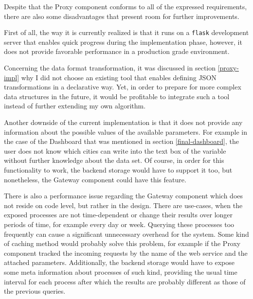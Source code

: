 

Despite that the Proxy component conforms to all of the expressed requirements, there are also some disadvantages that present room for further improvements.

First of all, the way it is currently realized is that it runs on a \texttt{flask} development server that enables quick progress during the implementation phase, however, it does not provide favorable performance in a production grade environment.

Concerning the data format transformation, it was discussed in section \ref{proxy-impl} why I did not choose an existing tool that enables defining JSON transformations in a declarative way. Yet, in order to prepare for more complex data structures in the future, it would be profitable to integrate such a tool instead of further extending my own algorithm.

Another downside of the current implementation is that it does not provide any information about the possible values of the available parameters. For example in the case of the Dashboard that was mentioned in section \ref{final-dashboard}, the user does not know which cities can write into the text box of the variable without further knowledge about the data set. Of course, in order for this functionality to work, the backend storage would have to support it too, but nonetheless, the Gateway component could have this feature.

There is also a performance issue regarding the Gateway component which does not reside on code level, but rather in the design. There are use-cases, when the exposed processes are not time-dependent or change their results over longer periods of time, for example every day or week. Querying these processes too frequently can cause a significant unnecessary overhead for the system. Some kind of caching method would probably solve this problem, for example if the Proxy component tracked the incoming requests by the name of the web service and the attached parameters. Additionally, the backend storage would have to expose some meta information about processes of such kind, providing the usual time interval for each process after which the results are probably different as those of the previous queries.

